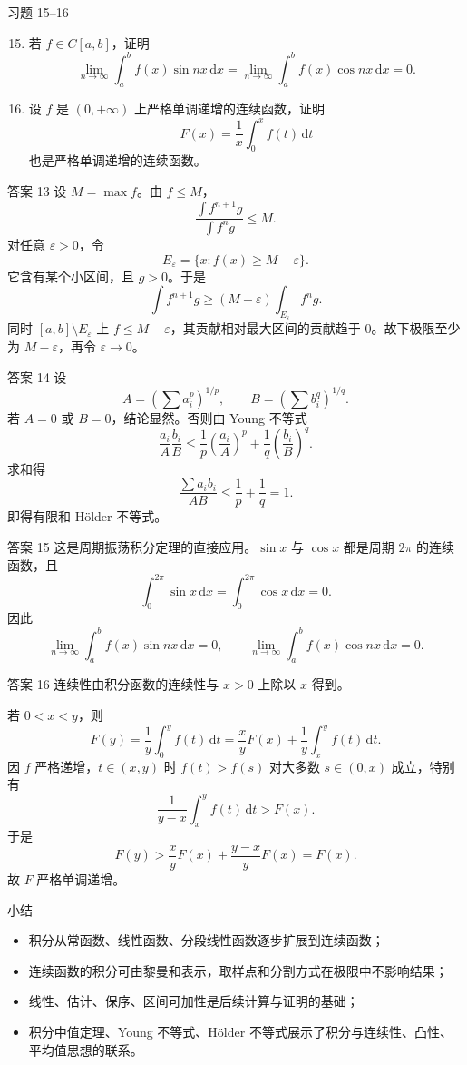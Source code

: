 ﻿\documentclass[aspectratio=169,11pt]{ctexbeamer}
\newcommand{\dd}{\,\mathrm{d}}
\begin{document}
\begin{frame}{习题 15--16}
  \begin{enumerate}
    \setcounter{enumi}{14}
    \item 若 $f\in C[a,b]$，证明
    \[
      \lim_{n\to\infty}\int_a^b f(x)\sin nx\dd x
      =\lim_{n\to\infty}\int_a^b f(x)\cos nx\dd x=0.
    \]
    \item 设 $f$ 是 $(0,+\infty)$ 上严格单调递增的连续函数，证明
    \[
      F(x)=\frac1x\int_0^x f(t)\dd t
    \]
    也是严格单调递增的连续函数。
  \end{enumerate}
\end{frame}

\begin{frame}{答案 13}
  设 $M=\max f$。由 $f\le M$，
  \[
    \frac{\int f^{n+1}g}{\int f^n g}\le M.
  \]
  对任意 $\varepsilon>0$，令
  \[
    E_\varepsilon=\{x:f(x)\ge M-\varepsilon\}.
  \]
  它含有某个小区间，且 $g>0$。于是
  \[
    \int f^{n+1}g\ge (M-\varepsilon)\int_{E_\varepsilon}f^n g.
  \]
  同时 $[a,b]\setminus E_\varepsilon$ 上 $f\le M-\varepsilon$，其贡献相对最大区间的贡献趋于 $0$。故下极限至少为 $M-\varepsilon$，再令 $\varepsilon\to0$。
\end{frame}

\begin{frame}{答案 14}
  设
  \[
    A=\left(\sum a_i^p\right)^{1/p},\qquad
    B=\left(\sum b_i^q\right)^{1/q}.
  \]
  若 $A=0$ 或 $B=0$，结论显然。否则由 Young 不等式
  \[
    \frac{a_i}{A}\frac{b_i}{B}
    \le \frac1p\left(\frac{a_i}{A}\right)^p
       +\frac1q\left(\frac{b_i}{B}\right)^q.
  \]
  求和得
  \[
    \frac{\sum a_i b_i}{AB}
    \le\frac1p+\frac1q=1.
  \]
  即得有限和 Hölder 不等式。
\end{frame}

\begin{frame}{答案 15}
  这是周期振荡积分定理的直接应用。$\sin x$ 与 $\cos x$ 都是周期 $2\pi$ 的连续函数，且
  \[
    \int_0^{2\pi}\sin x\dd x=\int_0^{2\pi}\cos x\dd x=0.
  \]
  因此
  \[
    \lim_{n\to\infty}\int_a^b f(x)\sin nx\dd x=0,\qquad
    \lim_{n\to\infty}\int_a^b f(x)\cos nx\dd x=0.
  \]
\end{frame}

\begin{frame}{答案 16}
  连续性由积分函数的连续性与 $x>0$ 上除以 $x$ 得到。

  若 $0<x<y$，则
  \[
    F(y)=\frac1y\int_0^y f(t)\dd t
    =\frac{x}{y}F(x)+\frac1y\int_x^y f(t)\dd t.
  \]
  因 $f$ 严格递增，$t\in(x,y)$ 时 $f(t)>f(s)$ 对大多数 $s\in(0,x)$ 成立，特别有
  \[
    \frac1{y-x}\int_x^y f(t)\dd t>F(x).
  \]
  于是
  \[
    F(y)>\frac{x}{y}F(x)+\frac{y-x}{y}F(x)=F(x).
  \]
  故 $F$ 严格单调递增。
\end{frame}

\begin{frame}{小结}
  \begin{itemize}
    \item 积分从常函数、线性函数、分段线性函数逐步扩展到连续函数；
    \item 连续函数的积分可由黎曼和表示，取样点和分割方式在极限中不影响结果；
    \item 线性、估计、保序、区间可加性是后续计算与证明的基础；
    \item 积分中值定理、Young 不等式、Hölder 不等式展示了积分与连续性、凸性、平均值思想的联系。
  \end{itemize}
\end{frame}
\end{document}

